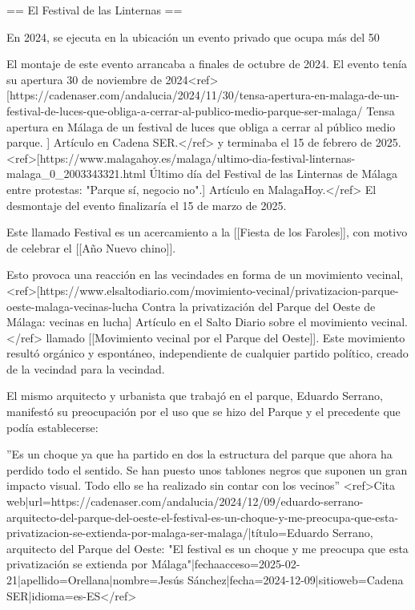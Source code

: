 == El Festival de las Linternas ==

En 2024, se ejecuta en la ubicación un evento privado que ocupa más del 50%

El montaje de este evento arrancaba a finales de octubre de 2024. El evento tenía su apertura 30 de noviembre de 2024<ref>[https://cadenaser.com/andalucia/2024/11/30/tensa-apertura-en-malaga-de-un-festival-de-luces-que-obliga-a-cerrar-al-publico-medio-parque-ser-malaga/ Tensa apertura en Málaga de un festival de luces que obliga a cerrar al público medio parque. ] Artículo en Cadena SER.</ref> y terminaba el 15 de febrero de 2025.<ref>[https://www.malagahoy.es/malaga/ultimo-dia-festival-linternas-malaga_0_2003343321.html Último día del Festival de las Linternas de Málaga entre protestas: "Parque sí, negocio no".] Artículo en MalagaHoy.</ref> El desmontaje del evento finalizaría el 15 de marzo de 2025.

Este llamado Festival es un acercamiento a la [[Fiesta de los Faroles]], con motivo de celebrar el [[Año Nuevo chino]]. 

Esto provoca una reacción en las vecindades en forma de un movimiento vecinal,<ref>[https://www.elsaltodiario.com/movimiento-vecinal/privatizacion-parque-oeste-malaga-vecinas-lucha Contra la privatización del Parque del Oeste de Málaga: vecinas en lucha] Artículo en el Salto Diario sobre el movimiento vecinal.</ref> llamado [[Movimiento vecinal por el Parque del Oeste]]. Este movimiento resultó orgánico y espontáneo, independiente de cualquier partido político, creado de la vecindad para la vecindad.

El mismo arquitecto y urbanista que trabajó en el parque, Eduardo Serrano, manifestó su preocupación por el uso que se hizo del Parque y el precedente que podía establecerse:

''Es un choque ya que ha partido en dos la estructura del parque que ahora ha perdido todo el sentido. Se han puesto unos tablones negros que suponen un gran impacto visual. Todo ello se ha realizado sin contar con los vecinos'' <ref>{{Cita web|url=https://cadenaser.com/andalucia/2024/12/09/eduardo-serrano-arquitecto-del-parque-del-oeste-el-festival-es-un-choque-y-me-preocupa-que-esta-privatizacion-se-extienda-por-malaga-ser-malaga/|título=Eduardo Serrano, arquitecto del Parque del Oeste: "El festival es un choque y me preocupa que esta privatización se extienda por Málaga"|fechaacceso=2025-02-21|apellido=Orellana|nombre=Jesús Sánchez|fecha=2024-12-09|sitioweb=Cadena SER|idioma=es-ES}}</ref>

